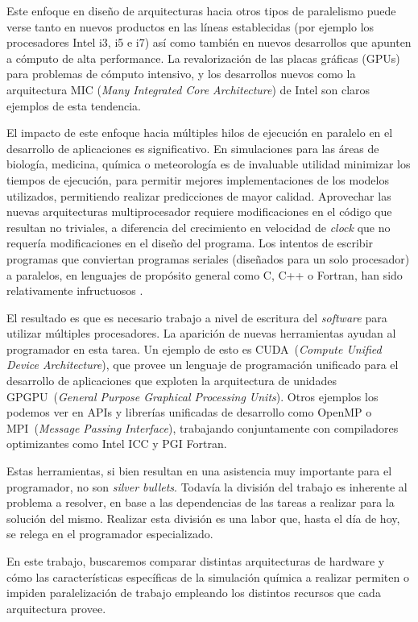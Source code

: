 Este enfoque en dise\~no de arquitecturas hacia otros tipos de paralelismo puede verse tanto en nuevos productos en las l\'ineas establecidas (por ejemplo los procesadores Intel i3, i5 e i7) as\'i como tambi\'en en nuevos desarrollos que apunten a c\'omputo de alta performance.
La revalorizaci\'on de las placas gr\'aficas (GPUs) para problemas de c\'omputo intensivo, y los desarrollos nuevos como la arquitectura MIC (\textit{Many Integrated Core Architecture}) de Intel son claros ejemplos de esta tendencia.

El impacto de este enfoque hacia m\'ultiples hilos de ejecuci\'on en paralelo en el desarrollo de aplicaciones es significativo.
En simulaciones para las \'areas de biolog\'ia, medicina, qu\'imica o meteorolog\'ia es de invaluable utilidad minimizar los tiempos de ejecuci\'on, para permitir mejores implementaciones de los modelos utilizados, permitiendo realizar predicciones de mayor calidad.
Aprovechar las nuevas arquitecturas multiprocesador requiere modificaciones en el c\'odigo que resultan no triviales, a diferencia del crecimiento en velocidad de \textit{clock} que no requer\'ia modificaciones en el dise\~no del programa.
Los intentos de escribir programas que conviertan programas seriales (dise\~nados para un solo procesador) a paralelos, en lenguajes de prop\'osito general como C, C++ o Fortran, han sido relativamente infructuosos .

El resultado es que es necesario trabajo a nivel de escritura del \textit{software} para utilizar m\'ultiples procesadores.
La aparici\'on de nuevas herramientas ayudan al programador en esta tarea.
Un ejemplo de esto es \nvidia CUDA~(\textit{Compute Unified Device Architecture}), que provee un lenguaje de programaci\'on unificado para el desarrollo de aplicaciones que exploten la arquitectura de unidades GPGPU~(\textit{General Purpose Graphical Processing Units}).
Otros ejemplos los podemos ver en APIs y librer\'ias unificadas de desarrollo como OpenMP o MPI~(\textit{Message Passing Interface}), trabajando conjuntamente con compiladores
optimizantes como Intel ICC y PGI Fortran.

Estas herramientas, si bien resultan en una asistencia muy importante para el programador, no son \textit{silver bullets}.
Todav\'ia la divisi\'on del trabajo es inherente al problema a resolver, en base a las dependencias de las tareas a realizar para la soluci\'on del mismo.
Realizar esta divisi\'on es una labor que, hasta el d\'ia de hoy, se relega en el programador especializado.

En este trabajo, buscaremos comparar distintas arquitecturas de hardware y c\'omo las caracter\'isticas espec\'ificas de la simulaci\'on qu\'imica a realizar permiten o impiden paralelizaci\'on de trabajo empleando los distintos recursos que cada arquitectura provee.
